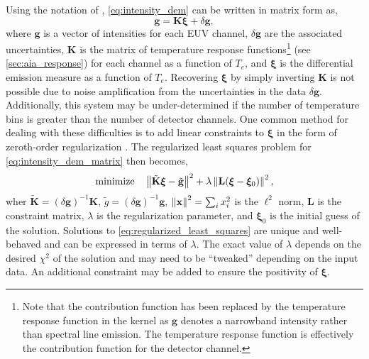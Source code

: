 Using the notation of \citet{hannah_differential_2012}, \autoref{eq:intensity_dem} can be written in matrix form as,
\begin{equation}\label{eq:intensity_dem_matrix}
    \mathbf{g} = \mathbf{K} \bm{\xi} + \delta\mathbf{g},
\end{equation}
where $\mathbf{g}$ is a vector of intensities for each EUV channel, $\delta\mathbf{g}$ are the associated uncertainties, $\mathbf{K}$ is the matrix 
of temperature response functions\footnote{Note that the contribution function has been replaced by the temperature response function in the kernel as $\mathbf{g}$ denotes a narrowband intensity rather than spectral line emission. The temperature response function is effectively the contribution function for the detector channel.} (see \autoref{sec:aia_response}) for each channel as a function of $T_e$, and $\bm{\xi}$ is the differential emission measure as a function of $T_e$. Recovering $\bm{\xi}$ by simply inverting $\mathbf{K}$ is not possible due to noise amplification from the uncertainties in the data $\delta\mathbf{g}$. Additionally, this system may be under-determined if the number of temperature bins is greater than the number of detector channels. One common method for dealing with these difficulties is to add linear constraints to $\bm{\xi}$ in the form of zeroth-order regularization \citep[e.g.][]{tikhonov_solution_1963}. The regularized least squares problem for \autoref{eq:intensity_dem_matrix} then becomes,
\begin{equation}\label{eq:regularized_least_squares}
    \textup{minimize} \quad \left\lVert\tilde{\mathbf{K}}\bm{\xi} - \tilde{\mathbf{g}}\right\rVert^2 + \lambda\left\lVert\mathbf{L}(\bm{\xi} - \bm{\xi}_0)\right\rVert^2,
\end{equation}
wher $\tilde{\mathbf{K}}=(\delta\mathbf{g})^{-1}\mathbf{K}$, $\tilde{g}=(\delta\mathbf{g})^{-1}\mathbf{g}$, $\left\lVert\mathbf{x}\right\rVert^2=\sum_ix_i^2$ is the $\ell^2$ norm, $\mathbf{L}$ is the constraint matrix, $\lambda$ is the regularization parameter, and $\bm{\xi}_0$ is the initial guess of the solution. Solutions to \autoref{eq:regularized_least_squares} are unique and well-behaved and can be expressed in terms of $\lambda$. The exact value of $\lambda$ depends on the desired $\chi^2$ of the solution and may need to be ``tweaked'' depending on the input data. An additional constraint may be added to ensure the positivity of $\bm{\xi}$.

